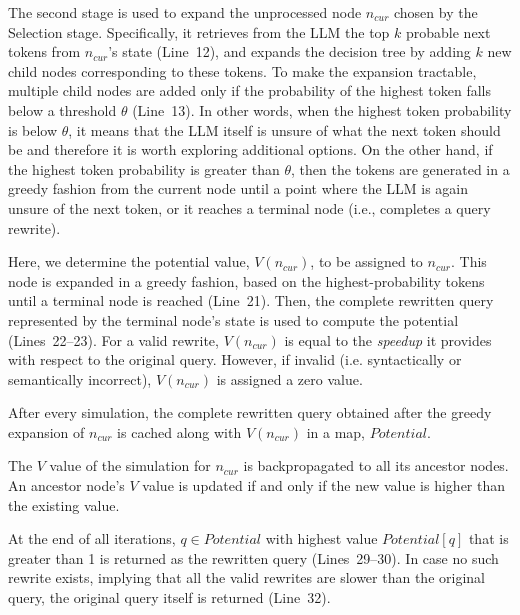 The second stage is used to expand the unprocessed node $n_{cur}$ chosen by the Selection stage. Specifically, it retrieves from the LLM the top $k$ probable next tokens from $n_{cur}$'s state (Line~12), and expands the decision tree by adding $k$ new child nodes corresponding to these tokens.
%
To make the expansion tractable, multiple child nodes are added only if the probability of the highest token falls below a threshold $\theta$ (Line~13). In other words, when the highest token probability is below $\theta$, it means that the LLM itself is unsure of what the next token should be and therefore it is worth exploring additional options. 
%
On the other hand, if the highest token probability is greater than $\theta$, then the tokens are generated in a greedy fashion from the current node until a point where the LLM is again unsure of the next token, or it reaches a terminal node (i.e., completes a query rewrite).

 Here, we determine the potential value, $V(n_{cur})$, to be assigned to 
$n_{cur}$. This node is expanded in a greedy fashion, based on the highest-probability tokens until a terminal node is reached (Line~21). Then, the complete rewritten query represented by the terminal node's state is used to compute the potential (Lines~22--23). For a valid rewrite, $V(n_{cur})$ is equal to the \textit{speedup} it provides with respect to the original query. However, if invalid (i.e. syntactically or semantically incorrect), $V(n_{cur})$ is assigned a zero value. 
%

After every simulation, the complete rewritten query obtained after the greedy expansion of $n_{cur}$ is cached along with $V(n_{cur})$ in a map, $Potential$. 

 The $V$ value of the simulation for $n_{cur}$ is backpropagated to all its ancestor nodes. An ancestor node's $V$ value is updated if and only if the new value is higher than the existing value.

%
At the end of all iterations, $q \in Potential$ with highest value $Potential[q]$ that is greater than 1 is returned as the rewritten query (Lines~29--30).
In case no such rewrite exists, implying that all the valid rewrites are slower than the original query, the original query itself is returned (Line~32).

